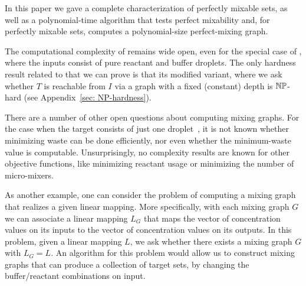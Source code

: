 

In this paper we gave a complete characterization of perfectly mixable sets,
as well as a polynomial-time algorithm that tests perfect mixability and,
for perfectly mixable sets, computes a polynomial-size perfect-mixing graph.   

The computational complexity of {\MixReachability} remains wide open, even for
the special case of {\MixProducibility}, where
the inputs consist of pure reactant and buffer droplets.
The only hardness result related to {\MixReachability} that we can prove is
that its modified variant, where we ask whether $T$ is reachable from $I$ via
a graph with a fixed (constant) depth is ${\mathbb{NP}}$-hard (see Appendix~\ref{sec: NP-hardness}).

There are a number of other open questions about computing mixing graphs. For the
case when the target consists of just 
one droplet~\cite{thies2008abstraction,roy2010optimization,huang2012reactant,chiang2013graph},
it is not known whether minimizing waste can be done efficiently, nor even whether
the minimum-waste value is computable.
Unsurprisingly, no complexity results are known for other objective functions, like
minimizing reactant usage or minimizing the number of micro-mixers.

As another example, one can consider the problem of computing a mixing graph
that realizes a given linear mapping. More specifically,
with each mixing graph $G$ we can associate a linear mapping $L_G$ that
maps the vector of concentration values on its inputs to the vector of
concentration values on its outputs. In this problem,
given a linear mapping $L$, we ask whether there exists a mixing graph $G$ with $L_G = L$. 
An algorithm for this problem would allow us to construct mixing graphs that 
can produce a collection of target sets, by changing the buffer/reactant combinations on input.